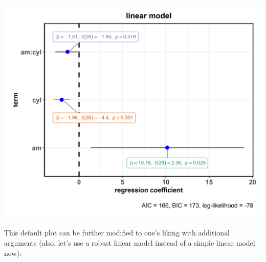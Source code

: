 \documentclass[]{article}
\begin{document}
\includegraphics[width=1\linewidth]{./figures/paper-ggcoefstats1-1}

This default plot can be further modified to one's liking with additional arguments
(also, let's use a robust linear model instead of a simple linear model now):
\end{document}
